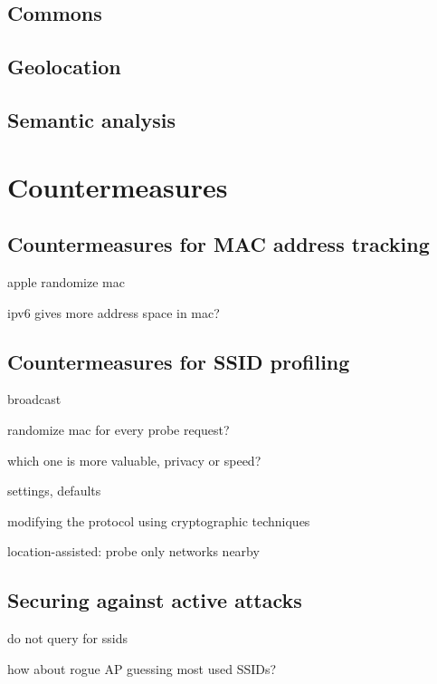 \documentclass[12pt,a4paper,oneside,pdftex]{report}
\begin{document}
\section{Commons}
\label{sec:practical_commons}

\section{Geolocation}
\label{sec:practical_geo}

\section{Semantic analysis}
\label{sec:practical_semantic}





\chapter{Countermeasures}
\label{chapter:countermeasures}

\section{Countermeasures for MAC address tracking}
apple randomize mac

ipv6 gives more address space in mac?


\section{Countermeasures for SSID profiling}
\label{sec:countermeasures_ssid}
broadcast

randomize mac for every probe request?

which one is more valuable, privacy or speed?

settings, defaults

modifying the protocol using cryptographic techniques \cite{lindqvist2009privacy}

location-assisted: probe only networks nearby \cite{kimposter}

\section{Securing against active attacks}

do not query for ssids

how about rogue AP guessing most used SSIDs?
\end{document}
